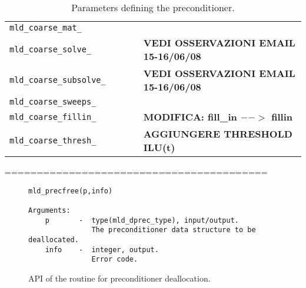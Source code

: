 \begin{table}[p]
{\begin{center}
\begin{tabular}{|l|l|p{1.5cm}|l|p{6cm}|}
\verb|mld_coarse_mat_|   &
                         &
                         &
                         &     \\
\verb|mld_coarse_solve_| &
                         &
                         &
                         & \textbf{VEDI OSSERVAZIONI EMAIL 15-16/06/08}\\
\verb|mld_coarse_subsolve_| &
                         &
                         &
                         & \textbf{VEDI OSSERVAZIONI EMAIL 15-16/06/08}\\
\verb|mld_coarse_sweeps_|&                         
                         &
                         &
                         &     \\
\verb|mld_coarse_fillin_| &
                         &
                         &
                         &     \textbf{MODIFICA: fill\_in $-->$ fillin} \\
\verb|mld_coarse_thresh_| &
                         &
                         &
                         &    \textbf{AGGIUNGERE THRESHOLD ILU(t)} \\ \hline
\end{tabular}
\end{center}
}
\caption{Parameters defining the preconditioner.\label{tab:precinit}}
\end{table}

\clearpage


\noindent
=========================================\\

\begin{figure}[h]
\begin{center}
{\small
\begin{verbatim}
mld_precfree(p,info)

Arguments:
    p       -  type(mld_dprec_type), input/output.
               The preconditioner data structure to be deallocated.
    info    -  integer, output.
               Error code.
\end{verbatim}
}
\end{center}
\caption{API of the routine for preconditioner deallocation.\label{fig:prcfree}}
\end{figure}

